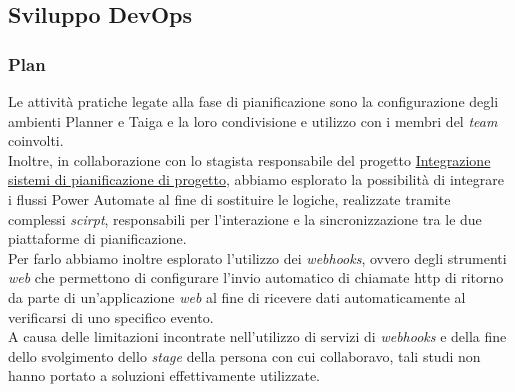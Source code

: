 \subsection{Sviluppo DevOps}
\label{Sviluppo DevOps}
\subsubsection*{Plan} 
Le attività pratiche legate alla fase di pianificazione sono la configurazione degli ambienti Planner e Taiga e la loro condivisione e utilizzo con i membri del \emph{team} coinvolti.\\
Inoltre, in collaborazione con lo stagista responsabile del progetto \hyperref[stageGiacomo]{Integrazione sistemi di pianificazione di progetto}, abbiamo esplorato la possibilità di integrare i flussi Power Automate al fine di sostituire le logiche, realizzate tramite complessi \emph{scirpt}, responsabili per l'interazione e la sincronizzazione tra le due piattaforme di pianificazione.\\
Per farlo abbiamo inoltre esplorato l'utilizzo dei \emph{webhooks}, ovvero degli strumenti \emph{web} che permettono di configurare l'invio automatico di chiamate \gls{http} di ritorno da parte di un'applicazione \emph{web} al fine di ricevere dati automaticamente al verificarsi di uno specifico evento.\\
A causa delle limitazioni incontrate nell'utilizzo di servizi di \emph{webhooks} e della fine dello svolgimento dello \emph{stage} della persona con cui collaboravo, tali studi non hanno portato a soluzioni effettivamente utilizzate.


